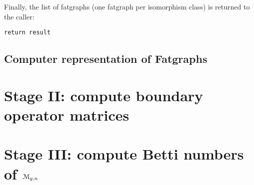 Finally, the list of fatgraphs (one fatgraph per isomorphism class) is
returned to the caller:
\begin{lstlisting}[name=MgnTrivalentGraphs,firstnumber=50]
    return result
\end{lstlisting}


\subsection{Computer representation of Fatgraphs}
\label{sec:stage1-fatgraphs}



\section[Stage II]{Stage II: compute boundary operator matrices}
\label{sec:stage-ii}

\section[Stage III]{Stage III: compute Betti numbers of $\mathcal{M}_{g,n}$}
\label{sec:stage-iii}



